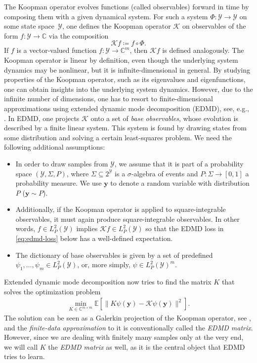 \documentclass[preprint,12pt,authoryear]{elsarticle}
\newcommand{\C}{\mathbb{C}}
\newcommand\Kc{\mathcal K}
\newcommand\Yc{\mathcal Y}
\newcommand\Koopman{\Kc}
\begin{document}
The Koopman operator evolves functions (called observables) forward in time by composing them with a given dynamical system. 
For such a system $\Phi : \Yc \rightarrow \Yc$ on some state space~$\Yc$, one defines the Koopman operator $\Koopman$ on observables of the form $f : \Yc \rightarrow \C$ via the composition %
$$
    \Koopman f \coloneqq f \circ \Phi. 
$$
If $f$ is a vector-valued function $f: \Yc \rightarrow \C^m$, then $\Koopman f$ is defined analogously. The Koopman operator is linear by definition, even though the underlying system dynamics may be nonlinear, but it is infinite-dimensional in general. By studying properties of the Koopman operator, such as its eigenvalues and eigenfunctions, one can obtain insights into the underlying system dynamics.
However, due to the infinite number of dimensions, one has to resort to finite-dimensional approximations using extended dynamic mode decomposition (EDMD), see, e.g., \cite{WKR15}.
In EDMD, one projects $\Koopman$ onto a set of \emph{base observables}, whose evolution is described by a finite linear system. This system is found by drawing states from some distribution and solving a certain least-squares problem. We need the following additional assumptions:
\begin{itemize}[noitemsep]
    \item In order to draw samples from $\Yc$, we assume that it is part of a probability space $(\Yc,\Sigma,P)$, where $\Sigma \subseteq 2^\Yc$ is a $\sigma$-algebra of events and $P : \Sigma \rightarrow [0,1]$ a probability measure. We use  $\bm y$ to denote a random variable with distribution $P$ ($\bm y \sim P$).
    \item Additionally, if the Koopman operator is applied to square-integrable observables, it must again produce square-integrable observables. In other words, $f \in L^2_P(\Yc)$ implies $\Koopman f \in L^2_P(\Yc)$ so that the EDMD loss in \eqref{eq:edmd-loss} below has a well-defined expectation.
    \item The dictionary of base observables is given by a set of predefined $\psi_1,\dots,\psi_m \in L^2_P(\Yc)$, or, more simply, $\psi \in L^2_P(\Yc)^m$. 
\end{itemize}
Extended dynamic mode decomposition now tries to find the matrix $K$ that solves the optimization problem 
\begin{align}
    \min_{K \in \C^{m \times m}} \mathbb E[ \lVert K \psi(\bm y) - \Koopman \psi( \bm y) \rVert^2 ].
    \label{eq:edmd-loss}
\end{align}
The solution can be seen as a Galerkin projection of the Koopman operator, see \cite{WKR15}, and the \emph{finite-data approximation} to it is conventionally called the \emph{EDMD matrix}. However, since we are dealing with finitely many samples only at the very end, we will call $K$ the \emph{EDMD matrix} as well, as it is the central object that EDMD tries to learn.
\end{document}

